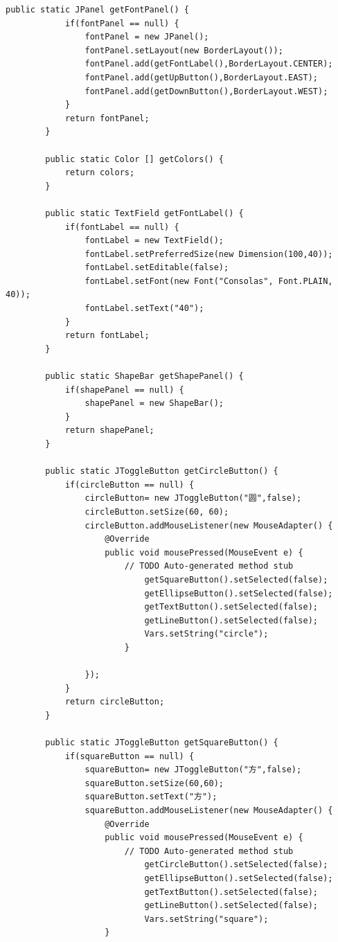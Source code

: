 \documentclass{ctexart}
\begin{document}
\begin{lstlisting}[caption = Vars.Java]
        public static JPanel getFontPanel() {
            if(fontPanel == null) {
                fontPanel = new JPanel();
                fontPanel.setLayout(new BorderLayout());
                fontPanel.add(getFontLabel(),BorderLayout.CENTER);
                fontPanel.add(getUpButton(),BorderLayout.EAST);
                fontPanel.add(getDownButton(),BorderLayout.WEST);
            }
            return fontPanel;
        }

        public static Color [] getColors() {
            return colors;
        }

        public static TextField getFontLabel() {
            if(fontLabel == null) {
                fontLabel = new TextField();
                fontLabel.setPreferredSize(new Dimension(100,40));
                fontLabel.setEditable(false);
                fontLabel.setFont(new Font("Consolas", Font.PLAIN, 40));
                fontLabel.setText("40");
            }
            return fontLabel;
        }
    
        public static ShapeBar getShapePanel() {
            if(shapePanel == null) {
                shapePanel = new ShapeBar();
            }
            return shapePanel;
        }

        public static JToggleButton getCircleButton() {
            if(circleButton == null) {
                circleButton= new JToggleButton("圆",false);
                circleButton.setSize(60, 60);
                circleButton.addMouseListener(new MouseAdapter() {			
                    @Override
                    public void mousePressed(MouseEvent e) {
                        // TODO Auto-generated method stub
                            getSquareButton().setSelected(false);
                            getEllipseButton().setSelected(false);
                            getTextButton().setSelected(false);
                            getLineButton().setSelected(false);
                            Vars.setString("circle");
                        }
    
                });
            }
            return circleButton;
        }

        public static JToggleButton getSquareButton() {
            if(squareButton == null) {
                squareButton= new JToggleButton("方",false);
                squareButton.setSize(60,60);
                squareButton.setText("方");
                squareButton.addMouseListener(new MouseAdapter() {			
                    @Override
                    public void mousePressed(MouseEvent e) {
                        // TODO Auto-generated method stub					
                            getCircleButton().setSelected(false);
                            getEllipseButton().setSelected(false);
                            getTextButton().setSelected(false);	
                            getLineButton().setSelected(false);
                            Vars.setString("square");
                    }
    

\end{lstlisting}
\end{document}
